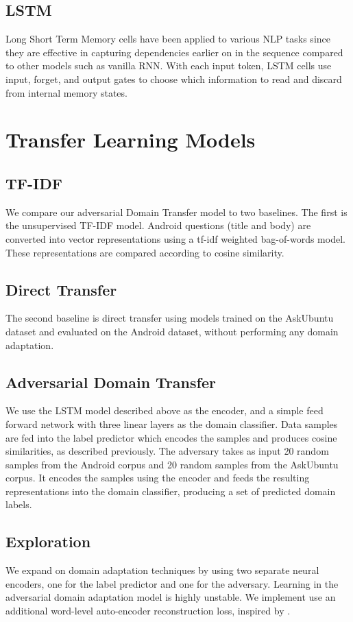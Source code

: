 \documentclass[11pt,a4paper]{article}
\begin{document}
\subsection*{LSTM}
Long Short Term Memory cells \cite{hochreiter} have been applied to various NLP tasks since they are effective in capturing dependencies earlier on in the sequence compared to other models such as vanilla RNN. With each input token, LSTM cells use input, forget, and output gates to choose which information to read and discard from internal memory states.
 
\section{Transfer Learning Models}
\subsection*{TF-IDF}
We compare our adversarial Domain Transfer model to two baselines. The first is the unsupervised TF-IDF model. Android questions (title and body) are converted into vector representations using a tf-idf weighted bag-of-words model. These representations are compared according to cosine similarity. 

\subsection*{Direct Transfer}
The second baseline is direct transfer using models trained on the AskUbuntu dataset and evaluated on the Android dataset, without performing any domain adaptation. 

\subsection*{Adversarial Domain Transfer}
We use the LSTM model described above as the encoder, and a simple feed forward network with three linear layers as the domain classifier. Data samples are fed into the label predictor which encodes the samples and produces cosine similarities, as described previously. The adversary takes as input 20 random samples from the Android corpus and 20 random samples from the AskUbuntu corpus. It encodes the samples using the encoder and feeds the resulting representations into the domain classifier, producing a set of predicted domain labels. 

\subsection*{Exploration}
We expand on domain adaptation techniques by using two separate neural encoders, one for the label predictor and one for the adversary. Learning in the adversarial domain adaptation model is highly unstable. We implement use an additional word-level auto-encoder reconstruction loss, inspired by \cite{zhang}.
\end{document}
